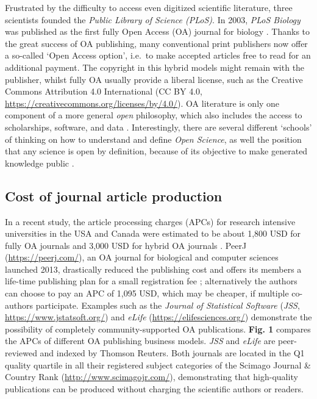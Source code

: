 \documentclass[10pt,fleqn]{wlpeerj}
\begin{document}
Frustrated
by
the
difficulty
to
access
even
digitized
scientific
literature,
three
scientists
founded
the
\emph{Public
Library
of
Science
(PLoS)}.
In
2003,
\emph{PLoS
Biology}
was
published
as
the
first
fully
Open
Access
(OA)
journal
for
biology
\citep{brown_why_2003, eisen_publish_2003}.
Thanks
to
the
great
success
of OA
publishing,
many
conventional
print
publishers
now
offer
a
so-called
`Open
Access
option',
i.e.~to
make
accepted
articles
free
to
read
for
an
additional
payment.
The
copyright
in
this
hybrid
models
might
remain
with
the
publisher,
whilst
fully
OA
usually
provide
a
liberal
license,
such
as
the
Creative
Commons
Attribution
4.0
International
(CC
BY
4.0,
\url{https://creativecommons.org/licenses/by/4.0/}).
OA
literature
is
only
one
component
of a
more
general
\emph{open}
philosophy,
which
also
includes
the
access
to
scholarships,
software,
and
data
\citep{willinsky_unacknowledged_2005}.
Interestingly,
there
are
several
different
`schools'
of
thinking
on
how
to
understand
and
define
\emph{Open
Science},
as
well
the
position
that
any
science
is
open
by
definition,
because
of
its
objective
to
make
generated
knowledge
public
\citep{fecher_open_2014}.

\subsection{Cost
of
journal
article
production}\label{cost-of-journal-article-production}

In a
recent
study,
the
article
processing
charges
(APCs)
for
research
intensive
universities
in
the
USA
and
Canada
were
estimated
to be
about
1,800
USD
for
fully
OA
journals
and
3,000
USD
for
hybrid
OA
journals
\citep{solomon_article_2016}.
PeerJ
(\url{https://peerj.com/}),
an OA
journal
for
biological
and
computer
sciences
launched
2013,
drastically
reduced
the
publishing
cost
and
offers
its
members
a
life-time
publishing
plan
for a
small
registration
fee
\citep{van_noorden_journal_2012};
alternatively
the
authors
can
choose
to
pay
an
APC
of
1,095
USD,
which
may
be
cheaper,
if
multiple
co-authors
participate.
Examples
such
as
the
\emph{Journal
of
Statistical
Software}
(\emph{JSS},
\url{https://www.jstatsoft.org/})
and
\emph{eLife}
(\url{https://elifesciences.org/})
demonstrate
the
possibility
of
completely
community-supported
OA
publications.
\textbf{Fig.
1}
compares
the
APCs
of
different
OA
publishing
business
models.
\emph{JSS}
and
\emph{eLife}
are
peer-reviewed
and
indexed
by
Thomson
Reuters.
Both
journals
are
located
in
the
Q1
quality
quartile
in
all
their
registered
subject
categories
of
the
Scimago
Journal
\&
Country
Rank
(\url{http://www.scimagojr.com/}),
demonstrating
that
high-quality
publications
can
be
produced
without
charging
the
scientific
authors
or
readers.
\end{document}
